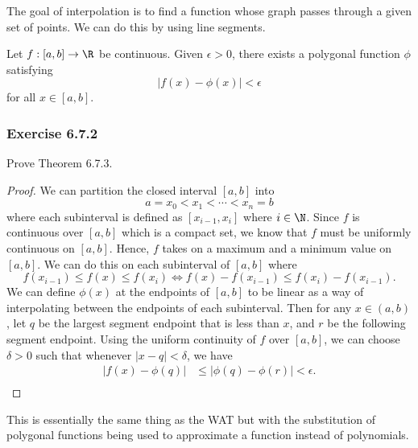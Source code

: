 The goal of interpolation is to find a function whose graph passes through a given set of points. We can do this by using line segments.

\begin{tcolorbox}
\begin{thm}
    Let \( f: [a,b] \to \R  \) be continuous. Given \( \epsilon > 0   \), there exists a polygonal function \( \phi  \) satisfying 
    \[  | f(x) - \phi(x) | < \epsilon \] for all \( x \in [a,b] \).
\end{thm}
\end{tcolorbox}

\subsubsection{Exercise 6.7.2} Prove Theorem 6.7.3.
\begin{proof}
    We can partition the closed interval \( [a,b]  \) into 
    \[  a = x_{0} < x_{1} < \dotsb < x_{n} = b  \] where each subinterval is defined as \( [x_{i-1}, x_{i}] \) where \( i \in \N  \). Since \( f  \) is continuous over \( [a,b]  \) which is a compact set, we know that \( f  \) must be uniformly continuous on \( [a,b] \). Hence, \( f  \) takes on a maximum and a minimum value on \( [a,b] \). We can do this on each subinterval of \( [a,b]  \) where 
    \[  f(x_{i-1}) \leq f(x) \leq f(x_{i}) \iff f(x) - f(x_{i-1}) \leq f(x_{i}) - f(x_{i-1}) .\] We can define \( \phi(x)  \) at the endpoints of \( [a,b]  \) to be linear as a way of interpolating between the endpoints of each subinterval. Then for any \( x \in (a,b)  \), let \( q  \) be the largest segment endpoint that is less  than \( x  \), and \( r  \) be the following segment endpoint. Using the uniform continuity of \( f \) over \( [a,b]  \), we can choose \( \delta > 0  \) such that whenever 
    \( | x - q  | <  \delta \), we have 
    \begin{align*}
        | f(x) - \phi(q)  | &\leq |  \phi(q) - \phi(r) | < \epsilon. \\
    \end{align*}
\end{proof}

This is essentially the same thing as the WAT but with the substitution of polygonal functions being used to approximate a function instead of polynomials.

